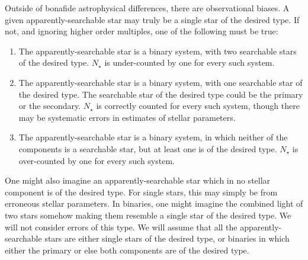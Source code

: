 \documentclass{emulateapj}
\begin{document}
Outside of bonafide astrophysical differences, there are observational biases.
A given apparently-searchable star may truly be a single star of the desired 
type. If not, and ignoring higher order multiples, one of the following must 
be true:
\begin{enumerate}	
\item The apparently-searchable star is a binary system, with two searchable 
stars of the desired type. $N_\star$ is under-counted by one for every such 
system.
%
\item The apparently-searchable star is a binary system, with one searchable 
star of the desired type. 
The searchable star of the desired type could be the primary or the secondary.
$N_\star$ is correctly counted for every such system, though there may be 
systematic errors in estimates of stellar parameters.
%
\item  The apparently-searchable star is a binary system, in which neither of 
the components is a searchable star, but at least one is of the desired type. 
$N_\star$ is over-counted by one for every such system.
\end{enumerate}

One might also imagine an apparently-searchable star which in no stellar 
component is of the desired type.
For single stars, this may simply be from erroneous stellar parameters.
In binaries, one might imagine the combined light of two stars somehow making 
them resemble a single star of the desired type.  We will 
not consider errors of this type.  We will assume that all the 
apparently-searchable stars are either single stars of
the desired type, or binaries in which either the primary or else both 
components are of the desired type.
\end{document}
